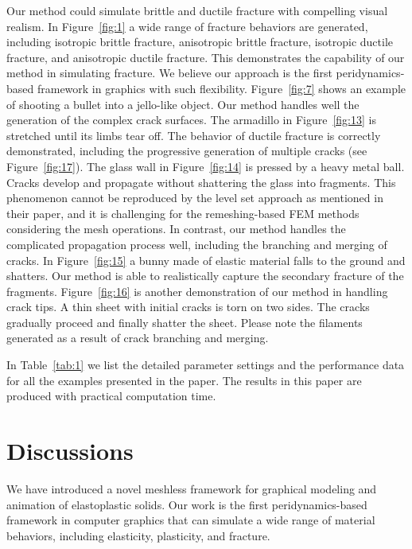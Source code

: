  Our method could simulate brittle and ductile fracture with compelling visual realism. In Figure~\ref{fig:1} a wide range of fracture behaviors are generated, including isotropic brittle fracture, anisotropic brittle fracture, isotropic ductile fracture, and anisotropic ductile fracture. This demonstrates the capability of our method in simulating fracture. We believe our approach is the first peridynamics-based framework in graphics with such flexibility. Figure~\ref{fig:7} shows an example of shooting a bullet into a jello-like object. Our method handles well the generation of the complex crack surfaces. The armadillo in Figure~\ref{fig:13} is stretched until its limbs tear off. The behavior of ductile fracture is correctly demonstrated, including the progressive generation of multiple cracks (see Figure~\ref{fig:17}). The glass wall in Figure~\ref{fig:14} is pressed by a heavy metal ball. Cracks develop and propagate without shattering the glass into fragments. This phenomenon cannot be reproduced by the level set approach \cite{Hegemann:2013:LSM:2485895.2485908} as mentioned in their paper, and it is challenging for the remeshing-based FEM methods \cite{O'Brien:1999:GMA:311535.311550,O'Brien:2002:GMA:566654.566579} considering the mesh operations. In contrast, our method handles the complicated propagation process well, including the branching and merging of cracks. In Figure~\ref{fig:15} a bunny made of elastic material falls to the ground and shatters. Our method is able to realistically capture the secondary fracture of the fragments. Figure~\ref{fig:16} is another demonstration of our method in handling crack tips. A thin sheet with initial cracks is torn on two sides. The cracks gradually proceed and finally shatter the sheet. Please note the filaments generated as a result of crack branching and merging.

In Table~\ref{tab:1} we list the detailed parameter settings and the performance data for all the examples presented in the paper. The results in this paper are produced with practical computation time.

\section{Discussions}
We have introduced a novel meshless framework for graphical modeling and animation of elastoplastic solids. Our work is the first peridynamics-based framework in computer graphics that can simulate a wide range of material behaviors, including elasticity, plasticity, and fracture.

